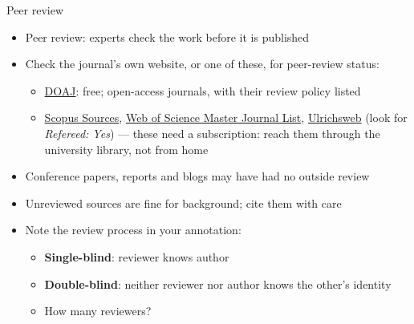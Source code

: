 \documentclass[aspectratio=169]{beamer}
\begin{document}
\begin{frame}{Peer review}
\begin{itemize}
  \item Peer review: experts check the work before it is published
  \item Check the journal's own website, or one of these, for peer-review status:
    \begin{itemize}
    \item \href{https://doaj.org/}{DOAJ}: free; open-access journals, with their
      review policy listed
    \item \href{https://www.scopus.com/sources}{Scopus Sources},
      \href{https://mjl.clarivate.com/}{Web of Science Master Journal List},
      \href{https://ulrichsweb.serialssolutions.com}{Ulrichsweb} (look for
      \textit{Refereed: Yes}) --- these need a subscription: reach them
      through the university library, not from home
    \end{itemize}
  \item Conference papers, reports and blogs may have had no outside review
  \item Unreviewed sources are fine for background; cite them with care
  \item Note the review process in your annotation:
    \begin{itemize}
    \item \textbf{Single-blind}: reviewer knows author
    \item \textbf{Double-blind}: neither reviewer nor author knows the other’s identity
    \item How many reviewers?
    \end{itemize}
\end{itemize}
\end{frame}
\end{document}
